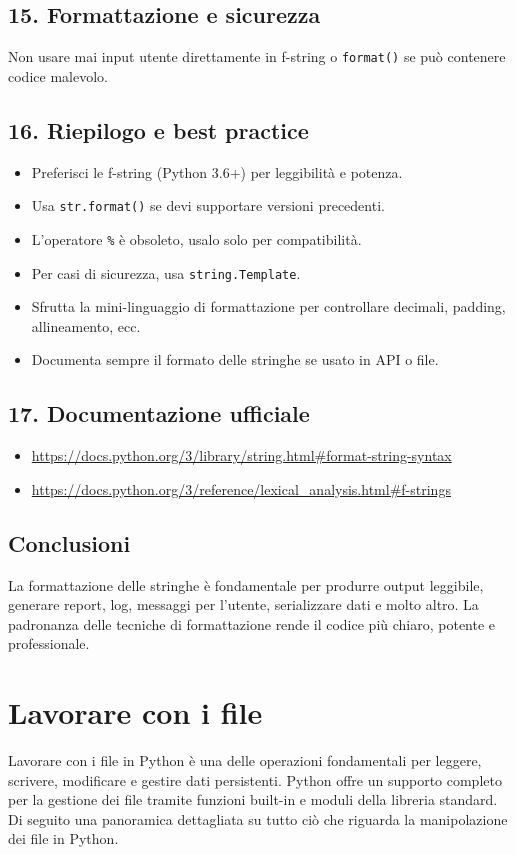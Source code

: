 \documentclass[a4paper,12pt]{article}
\begin{document}
\subsection*{15. Formattazione e sicurezza}
Non usare mai input utente direttamente in f-string o \texttt{format()} se può contenere codice malevolo.

\subsection*{16. Riepilogo e best practice}
\begin{itemize}
    \item Preferisci le f-string (Python 3.6+) per leggibilità e potenza.
    \item Usa \texttt{str.format()} se devi supportare versioni precedenti.
    \item L'operatore \texttt{\%} è obsoleto, usalo solo per compatibilità.
    \item Per casi di sicurezza, usa \texttt{string.Template}.
    \item Sfrutta la mini-linguaggio di formattazione per controllare decimali, padding, allineamento, ecc.
    \item Documenta sempre il formato delle stringhe se usato in API o file.
\end{itemize}

\subsection*{17. Documentazione ufficiale}
\begin{itemize}
    \item \url{https://docs.python.org/3/library/string.html#format-string-syntax}
    \item \url{https://docs.python.org/3/reference/lexical_analysis.html#f-strings}
\end{itemize}

\subsection*{Conclusioni}
La formattazione delle stringhe è fondamentale per produrre output leggibile, generare report, log, messaggi per l'utente, serializzare dati e molto altro. La padronanza delle tecniche di formattazione rende il codice più chiaro, potente e professionale.

\section{Lavorare con i file}
Lavorare con i file in Python è una delle operazioni fondamentali per leggere, scrivere, modificare e gestire dati persistenti. Python offre un supporto completo per la gestione dei file tramite funzioni built-in e moduli della libreria standard. Di seguito una panoramica dettagliata su tutto ciò che riguarda la manipolazione dei file in Python.
\end{document}
